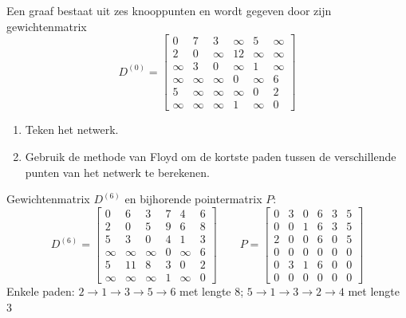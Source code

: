 \begin{oef}
\papier Een graaf bestaat uit zes knooppunten en wordt gegeven door zijn gewichtenmatrix
\begin{equation*}
D^{(0)}=\begin{bmatrix}
0 & 7 & 3 & \infty & 5 & \infty \\
2 & 0 & \infty & 12 & \infty & \infty \\
\infty & 3 & 0 & \infty & 1 & \infty \\
\infty & \infty & \infty & 0 & \infty & 6\\
5 & \infty & \infty & \infty & 0 & 2\\
\infty & \infty & \infty & 1 & \infty & 0
\end{bmatrix}
\end{equation*}
\begin{enumerate}
\item Teken het netwerk.
\item Gebruik de methode van Floyd om de kortste paden tussen de verschillende punten van het netwerk te berekenen.
\end{enumerate}
\begin{opl}
Gewichtenmatrix $D^{(6)}$ en bijhorende pointermatrix $P$:
\begin{equation*}
D^{(6)}=\begin{bmatrix}
0 & 6 & 3 & 7 & 4 & 6\\
2 & 0 & 5 & 9 & 6 & 8\\
5 & 3 & 0 & 4 & 1 & 3\\
\infty & \infty & \infty & 0 & \infty & 6 \\
5 & 11 & 8 & 3 & 0 & 2\\
\infty & \infty & \infty & 1 & \infty & 0
\end{bmatrix}
\qquad
P=\begin{bmatrix}
0 & 3 & 0 & 6 & 3 & 5 \\
0 & 0 & 1 & 6 & 3 & 5\\
2 &0 &0 & 6 & 0 & 5\\
0 & 0 & 0 & 0 & 0 & 0 \\
0 &  3 & 1 & 6 & 0 & 0 \\
0 & 0 & 0 & 0 & 0 & 0 
\end{bmatrix}
\end{equation*}
Enkele paden: $2\rightarrow1\rightarrow3\rightarrow5\rightarrow6$ met lengte 8; $5 \rightarrow 1 \rightarrow 3 \rightarrow  2\rightarrow 4$ met lengte 3
\end{opl}

\end{oef}

